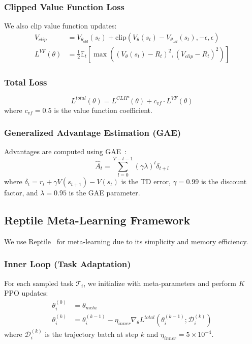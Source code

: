 \documentclass[journal,twoside]{IEEEtran}
\newcommand{\E}{\mathbb{E}}
\begin{document}
\subsubsection{Clipped Value Function Loss}

We also clip value function updates:
\begin{align}
V_{clip} &= V_{\theta_{old}}(s_t) + \text{clip}(V_\theta(s_t) - V_{\theta_{old}}(s_t), -\epsilon, \epsilon) \\
L^{VF}(\theta) &= \frac{1}{2} \E_t\left[ \max\left( (V_\theta(s_t) - R_t)^2, (V_{clip} - R_t)^2 \right) \right]
\label{eq:ppo_vf}
\end{align}

\subsubsection{Total Loss}
\begin{equation}
L^{total}(\theta) = L^{CLIP}(\theta) + c_{vf} \cdot L^{VF}(\theta)
\label{eq:ppo_total}
\end{equation}
where $c_{vf} = 0.5$ is the value function coefficient.

\subsubsection{Generalized Advantage Estimation (GAE)}

Advantages are computed using GAE~\cite{schulman2016gae}:
\begin{equation}
\hat{A}_t = \sum_{l=0}^{T-t-1} (\gamma \lambda)^l \delta_{t+l}
\label{eq:gae}
\end{equation}
where $\delta_t = r_t + \gamma V(s_{t+1}) - V(s_t)$ is the TD error, $\gamma = 0.99$ is the discount factor, and $\lambda = 0.95$ is the GAE parameter.

\subsection{Reptile Meta-Learning Framework}

We use Reptile~\cite{nichol2018reptile} for meta-learning due to its simplicity and memory efficiency.

\subsubsection{Inner Loop (Task Adaptation)}

For each sampled task $\mathcal{T}_i$, we initialize with meta-parameters and perform $K$ PPO updates:
\begin{align}
\theta_i^{(0)} &= \theta_{meta} \\
\theta_i^{(k)} &= \theta_i^{(k-1)} - \eta_{inner} \nabla_\theta L^{total}(\theta_i^{(k-1)}; \mathcal{D}_i^{(k)})
\end{align}
where $\mathcal{D}_i^{(k)}$ is the trajectory batch at step $k$ and $\eta_{inner} = 5 \times 10^{-4}$.
\end{document}
